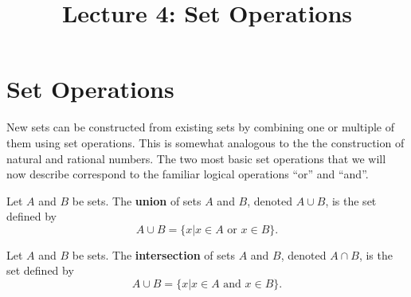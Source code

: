 \documentclass[a4paper,english,12pt]{article}
\begin{document}
\title{Lecture 4: Set Operations}
\author{}
\maketitle

\section{Set Operations}
New sets can be constructed from existing sets by combining one or multiple of them using set operations. This is somewhat analogous to the the construction of natural and rational numbers. The two most basic set operations that we will now describe correspond to the familiar logical operations ``or'' and ``and''. \\

\begin{defn}[Union] Let $A$ and $B$ be sets. The \textbf{union} of sets $A$ and $B$, denoted $A \cup B$, is the set defined by 
\begin{equation*}
 A \cup B = \{ x | x \in A \text{ or } x \in B \}.
\end{equation*}
\end{defn}
\begin{defn}[Intersection] Let $A$ and $B$ be sets. The \textbf{intersection} of sets $A$ and $B$, denoted $A \cap B$, is the set defined by 
\begin{equation*}
 A \cup B = \{ x | x \in A \text{ and } x \in B \}.
\end{equation*}
\end{defn}
\end{document}
